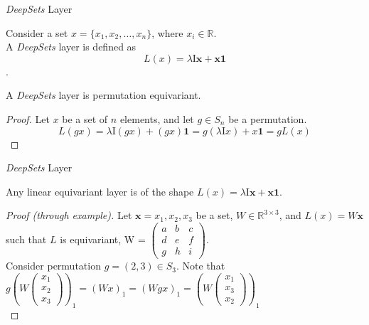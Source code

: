 \documentclass{beamer}
\begin{document}
\begin{frame}{\emph{DeepSets} Layer}

    \begin{definition}
        Consider a set $x = \{x_1, x_2, \ldots, x_n\}$, where $x_i \in \mathbb{R}$.\\
        A \emph{DeepSets} layer is defined as 
        \[L(x) = \lambda\mathrm{I}\mathbf{x} + \mathbf{x}\mathbf{1}\].
    \end{definition}

    \begin{theorem}
        A \emph{DeepSets} layer is permutation equivariant.
    \end{theorem}

    \begin{proof}
        Let $x$ be a set of $n$ elements, and let $g \in S_n$ be a permutation.
        \[ L(gx) = \lambda\mathrm{I}(gx) + (gx)\mathbf{1} = g(\lambda\mathrm{I}x) + x\mathbf{1} = gL(x)\]
    \end{proof}
\end{frame}
\begin{frame}{\emph{DeepSets} Layer}
    \begin{theorem}
        Any linear equivariant layer is of the shape \(L(x) = \lambda\mathrm{I}\mathbf{x} + \mathbf{x}\mathbf{1}\).
    \end{theorem}

    \renewcommand{\qedsymbol}{}
    \begin{proof}[Proof (through example)]
        Let $\mathbf{x}={x_1,x_2,x_3}$ be a set, $W \in \mathbb{R}^{3 \times 3}$, and $L(x) = W\mathbf{x}$ such that $L$ is equivariant, W = $\begin{pmatrix}
            a & b & c\\
            d & e & f\\
            g & h & i
        \end{pmatrix}$.\\
        Consider permutation $g=(2,3) \in S_3$. Note that $g\left(W\begin{pmatrix}
            x_1\\
            x_2\\
            x_3
        \end{pmatrix}\right)_1=(Wx)_1 = (Wgx)_1 = \left(W\begin{pmatrix}
            x_1\\
            x_3\\
            x_2
        \end{pmatrix}\right)_1$\\
    \end{proof}
    \renewcommand{\qedsymbol}{\ensuremath{\square}} 
\end{frame}
\end{document}
